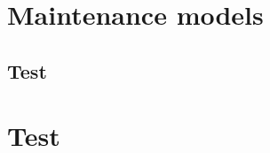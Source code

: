 
\cleardoublepage
\appendix
\chapter{Maintenance models}
\section{Test}\label{testchapter}
\chapter{Test}
%